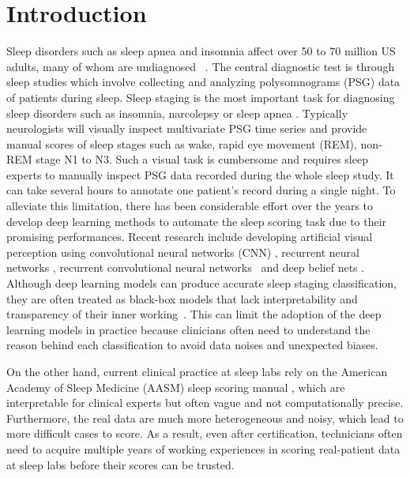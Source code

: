 \documentclass[pmlr]{jmlr}
\begin{document}
\section{Introduction}
Sleep disorders such as sleep apnea and insomnia affect over 50 to 70 million US adults,  many of whom are undiagnosed ~\citep{sleepstat}. The central diagnostic test is through sleep studies which involve collecting and analyzing  polysomnograms (PSG) data of patients during sleep.
Sleep staging  is the most important task for diagnosing sleep disorders such as insomnia, narcolepsy or sleep apnea \citep{nature}. Typically neurologists will visually inspect
multivariate PSG time series and provide manual scores of sleep stages such as wake, rapid eye movement (REM), non-REM stage N1 to N3.
Such a visual task is cumbersome and requires sleep experts to manually inspect PSG data recorded during the whole sleep study. It can take several hours to annotate one patient's record during a single night. To alleviate this limitation, there has been considerable effort over the years to develop deep learning methods to automate the sleep scoring task due to their promising performances. Recent research include developing artificial visual perception using convolutional neural networks (CNN) \citep{cnn},  recurrent neural networks \citep{rnn}, recurrent convolutional neural networks~\citep{10.1093/jamia/ocy131} and deep belief nets \citep{unsupervised}. 
Although deep learning models can produce accurate sleep staging classification, they are often treated as black-box models that lack interpretability and transparency of their inner working~\citep{DBLP:journals/corr/Lipton16a}. This can limit the adoption of the deep learning models in practice because clinicians often need to understand the reason behind each classification to avoid data noises and unexpected biases.

On the other hand, current clinical practice at sleep labs rely on the American Academy of Sleep Medicine (AASM) sleep scoring manual \citep{berry2012aasm}, which are interpretable for clinical experts but often vague and not computationally precise. Furthermore, the real data are much more heterogeneous and noisy, which lead to more difficult cases to score. As a result, even after certification, technicians often need to acquire multiple years of working experiences in scoring real-patient data at sleep labs before their scores can be trusted. 
\end{document}
